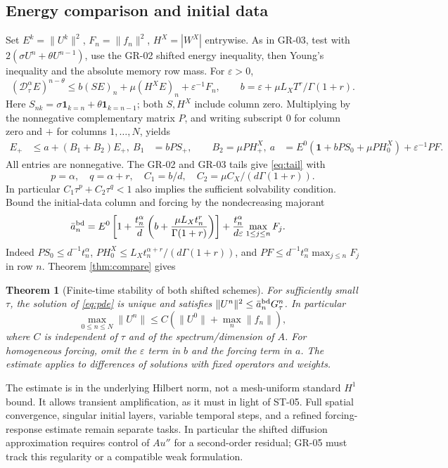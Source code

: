 \documentclass[11pt,a4paper]{article}
\newtheorem{theorem}{Theorem}
\newcommand{\one}{\mathbf1}
\newcommand{\norm}[1]{\lVert#1\rVert}
\begin{document}
\subsection*{Energy comparison and initial data}
Set $E^k=\norm{U^k}^2$, $F_n=\norm{f_n}^2$, $H^X=|W^X|$ entrywise. As in GR-03, test with $2(\sigma U^n+\theta U^{n-1})$, use the GR-02 shifted energy inequality, then Young's inequality and the absolute memory row mass. For $\varepsilon>0$,
\[
 (\mathcal D_\tau^\alpha E)^{n-\theta}\le b(SE)_n+\mu(H^XE)_n+\varepsilon^{-1}F_n,
 \qquad b=\varepsilon+\mu L_XT^r/\Gamma(1+r).
\]
Here $S_{nk}=\sigma\mathbf1_{k=n}+\theta\mathbf1_{k=n-1}$; both $S,H^X$ include column zero. Multiplying by the nonnegative complementary matrix $P$, and writing subscript $0$ for column zero and $+$ for columns $1,\ldots,N$, yields
\begin{align*}
 E_+&\le a+(B_1+B_2)E_+,\
 B_1&=bPS_+,\qquad B_2=\mu PH_+^X,\
 a&=E^0(\one+bPS_0+\mu PH_0^X)+\varepsilon^{-1}PF.
\end{align*}
All entries are nonnegative. The GR-02 and GR-03 tails give \eqref{eq:tail} with
\[
 p=\alpha,\quad q=\alpha+r,\quad C_1=b/d,\quad C_2=\mu C_X/(d\Gamma(1+r)).
\]
In particular $C_1\tau^p+C_2\tau^q<1$ also implies the sufficient solvability condition. Bound the initial-data column and forcing by the nondecreasing majorant
\begin{align*}
 \bar a_n^{\rm bd}={}& E^0\left[1+\frac{t_n^\alpha}{d}\left(b+\frac{\mu L_Xt_n^r}{\Gamma(1+r)}\right)\right]
 +\frac{t_n^\alpha}{d\varepsilon}\max_{1\le j\le n}F_j.
\end{align*}
Indeed $PS_0\le d^{-1}t_n^\alpha$, $PH_0^X\le L_Xt_n^{\alpha+r}/(d\Gamma(1+r))$, and $PF\le d^{-1}t_n^\alpha\max_{j\le n}F_j$ in row $n$. Theorem \ref{thm:compare} gives
\begin{theorem}[Finite-time stability of both shifted schemes]
For sufficiently small $\tau$, the solution of \eqref{eq:pde} is unique and satisfies $\norm{U^n}^2\le \bar a_n^{\rm bd}G_\tau^n$. In particular
\[
 \max_{0\le n\le N}\norm{U^n}\le C\left(\norm{U^0}+\max_n\norm{f_n}\right),
\]
where $C$ is independent of $\tau$ and of the spectrum/dimension of $A$. For homogeneous forcing, omit the $\varepsilon$ term in $b$ and the forcing term in $a$. The estimate applies to differences of solutions with fixed operators and weights.
\end{theorem}
The estimate is in the underlying Hilbert norm, not a mesh-uniform standard $H^1$ bound. It allows transient amplification, as it must in light of ST-05. Full spatial convergence, singular initial layers, variable temporal steps, and a refined forcing-response estimate remain separate tasks. In particular the shifted diffusion approximation requires control of $Au''$ for a second-order residual; GR-05 must track this regularity or a compatible weak formulation.
\end{document}
